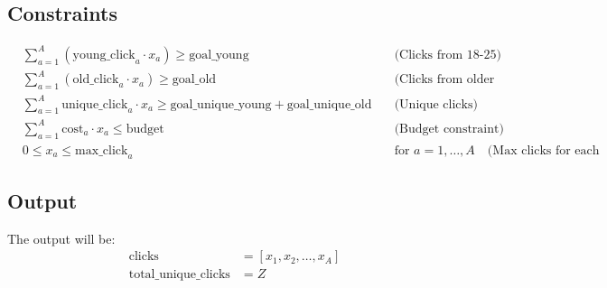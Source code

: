\documentclass{article}
\begin{document}
\subsection*{Constraints}
\begin{align*}
    & \sum_{a=1}^{A} ( \text{young\_click}_a \cdot x_a ) \geq \text{goal\_young} \quad & \text{(Clicks from 18-25)} \\
    & \sum_{a=1}^{A} ( \text{old\_click}_a \cdot x_a ) \geq \text{goal\_old} \quad & \text{(Clicks from older than 25)} \\
    & \sum_{a=1}^{A} \text{unique\_click}_a \cdot x_a \geq \text{goal\_unique\_young} + \text{goal\_unique\_old} \quad & \text{(Unique clicks)} \\
    & \sum_{a=1}^{A} \text{cost}_a \cdot x_a \leq \text{budget} \quad & \text{(Budget constraint)} \\
    & 0 \leq x_a \leq \text{max\_click}_a \quad & \text{for } a = 1, \ldots, A \quad \text{(Max clicks for each ad type)}
\end{align*}

\subsection*{Output}
The output will be:
\begin{align*}
    \text{clicks} &= [x_1, x_2, \ldots, x_A] \\
    \text{total\_unique\_clicks} &= Z
\end{align*}
\end{document}
